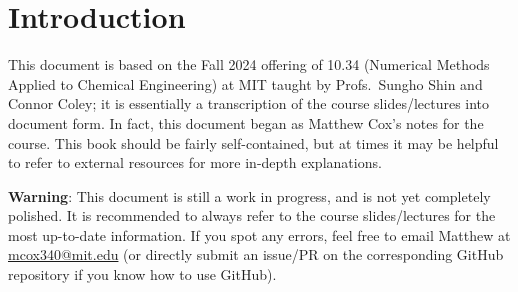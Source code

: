 \section{Introduction}
This document is based on the Fall 2024 offering of 10.34 (Numerical Methods Applied to Chemical Engineering) at MIT taught by Profs.\ Sungho Shin and Connor Coley; it is essentially a transcription of the course slides/lectures into document form. In fact, this document began as Matthew Cox's notes for the course. This book should be fairly self-contained, but at times it may be helpful to refer to external resources for more in-depth explanations.

\begin{warningBox}
    \textbf{Warning}: This document is still a work in progress, and is not yet completely polished. It is recommended to always refer to the course slides/lectures for the most up-to-date information. If you spot any errors, feel free to email Matthew at \href{mailto:mcox340@mit.edu}{mcox340@mit.edu} (or directly submit an issue/PR on the corresponding GitHub repository if you know how to use GitHub).
\end{warningBox}


